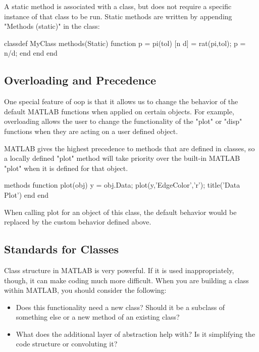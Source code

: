 \documentclass[10pt, openany, titlepage]{book}
\theoremstyle{definition}
\newcounter{example}[chapter]
\begin{document}
A static method is associated with a class, but does not require a specific instance of that class to be run. Static methods are written by appending "Methods (static)" in the class:

\begin{matlabscript}{}
classdef MyClass
   methods(Static)
       function p = pi(tol)
           [n d] = rat(pi,tol);
           p = n/d;
       end
   end
end
\end{matlabscript}

\subsection{Overloading and Precedence}
One special feature of \gls{oop} is that it allows us to change the behavior of the default MATLAB functions when applied on certain objects. For example, overloading allows the user to change the functionality of the "plot" or "disp" functions when they are acting on a user defined object.

MATLAB gives the highest precedence to methods that are defined in classes, so a locally defined "plot" method will take priority over the built-in MATLAB "plot" when it is defined for that object.

\begin{matlabscript}{}
   methods
      function plot(obj)
         y = obj.Data;
         plot(y,'EdgeColor','r');
         title('Data Plot')
      end
   end
\end{matlabscript}

When calling plot for an object of this class, the default behavior would be replaced by the custom behavior defined above.

\subsection{Standards for Classes}
Class structure in MATLAB is very powerful. If it is used inappropriately, though, it can make coding much more difficult. When you are building a class within MATLAB, you should consider the following:
\begin{itemize}
    \item Does this functionality need a new class? Should it be a subclass of something else or a new method of an existing class?
    \item What does the additional layer of abstraction help with? Is it simplifying the code structure or convoluting it?
\end{itemize}
\end{document}
